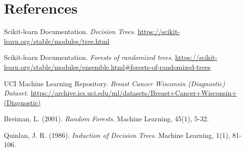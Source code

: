 \documentclass[12pt,a4paper]{article}
\begin{document}
\section{References}
\begin{enumerate}[label={[\arabic*]}]
    \item Scikit-learn Documentation. \textit{Decision Trees}. \url{https://scikit-learn.org/stable/modules/tree.html}
    \item Scikit-learn Documentation. \textit{Forests of randomized trees}. \url{https://scikit-learn.org/stable/modules/ensemble.html#forests-of-randomized-trees}
    \item UCI Machine Learning Repository. \textit{Breast Cancer Wisconsin (Diagnostic) Dataset}. \url{https://archive.ics.uci.edu/ml/datasets/Breast+Cancer+Wisconsin+(Diagnostic)}
    \item Breiman, L. (2001). \textit{Random Forests}. Machine Learning, 45(1), 5-32.
    \item Quinlan, J. R. (1986). \textit{Induction of Decision Trees}. Machine Learning, 1(1), 81-106.
\end{enumerate}
\end{document}
